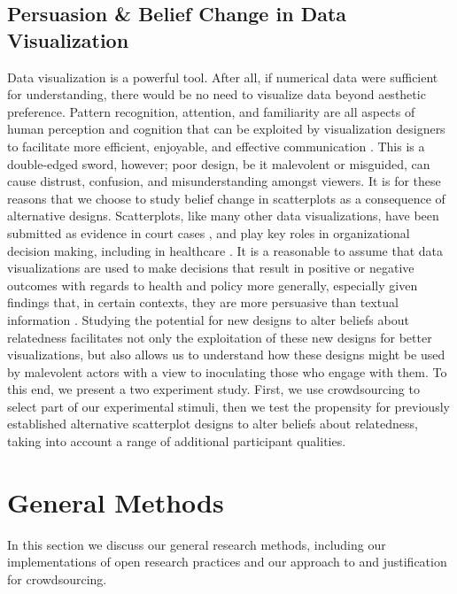 \documentclass[manuscript,screen,review,anonymous]{acmart}
\begin{document}
\subsection{Persuasion \& Belief Change in Data
Visualization}\label{sec-persuasion}

Data visualization is a powerful tool. After all, if numerical data were
sufficient for understanding, there would be no need to visualize data
beyond aesthetic preference. Pattern recognition, attention, and
familiarity are all aspects of human perception and cognition that can
be exploited by visualization designers to facilitate more efficient,
enjoyable, and effective communication \citep{franconeri_2021}. This is
a double-edged sword, however; poor design, be it malevolent or
misguided, can cause distrust, confusion, and misunderstanding amongst
viewers. It is for these reasons that we choose to study belief change
in scatterplots as a consequence of alternative designs. Scatterplots,
like many other data visualizations, have been submitted as evidence in
court cases \citep{bobko_1979}, and play key roles in organizational
decision making, including in healthcare \citep{poly_2019}. It is a
reasonable to assume that data visualizations are used to make decisions
that result in positive or negative outcomes with regards to health and
policy more generally, especially given findings that, in certain
contexts, they are more persuasive than textual information
\citep{pandey_2014}. Studying the potential for new designs to alter
beliefs about relatedness facilitates not only the exploitation of these
new designs for better visualizations, but also allows us to understand
how these designs might be used by malevolent actors with a view to
inoculating those who engage with them. To this end, we present a two
experiment study. First, we use crowdsourcing to select part of our
experimental stimuli, then we test the propensity for previously
established alternative scatterplot designs to alter beliefs about
relatedness, taking into account a range of additional participant
qualities.

\section{General Methods}\label{sec-general-methods}

In this section we discuss our general research methods, including our
implementations of open research practices and our approach to and
justification for crowdsourcing.
\end{document}

